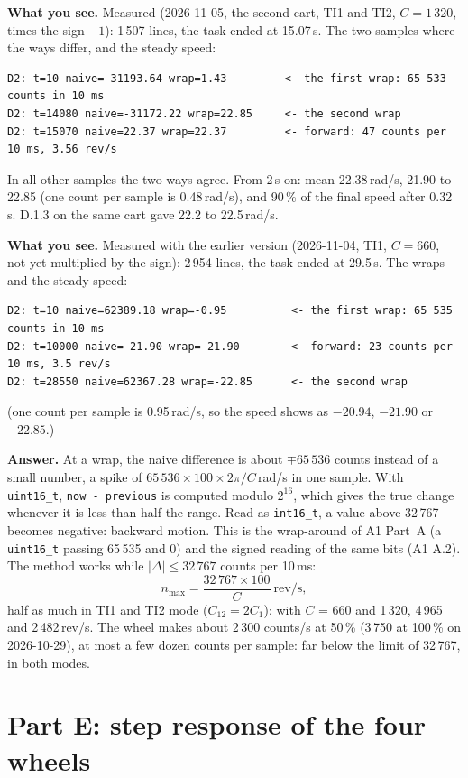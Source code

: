 \documentclass[11pt,a4paper]{article}
\newcommand{\see}[1]{\textbf{What you see.} #1}
\begin{document}
\see{Measured (2026-11-05, the second cart, TI1 and TI2, $C = 1\,320$, times the sign $-1$): 1\,507 lines, the task
ended at 15.07\,s. The two samples where the ways differ, and the steady speed:}
\begin{lstlisting}[language={},basicstyle=\ttfamily\scriptsize]
D2: t=10 naive=-31193.64 wrap=1.43         <- the first wrap: 65 533 counts in 10 ms
D2: t=14080 naive=-31172.22 wrap=22.85     <- the second wrap
D2: t=15070 naive=22.37 wrap=22.37         <- forward: 47 counts per 10 ms, 3.56 rev/s
\end{lstlisting}
In all other samples the two ways agree. From 2\,s on: mean 22.38\,rad/s, 21.90 to 22.85 (one count per sample
is 0.48\,rad/s), and 90\,\% of the final speed after 0.32\,s. D.1.3 on the same cart gave 22.2 to 22.5\,rad/s.

\see{Measured with the earlier version (2026-11-04, TI1, $C = 660$, not yet multiplied by the sign): 2\,954 lines,
the task ended at 29.5\,s. The wraps and the steady speed:}
\begin{lstlisting}[language={},basicstyle=\ttfamily\scriptsize]
D2: t=10 naive=62389.18 wrap=-0.95          <- the first wrap: 65 535 counts in 10 ms
D2: t=10000 naive=-21.90 wrap=-21.90        <- forward: 23 counts per 10 ms, 3.5 rev/s
D2: t=28550 naive=62367.28 wrap=-22.85      <- the second wrap
\end{lstlisting}
(one count per sample is 0.95\,rad/s, so the speed shows as $-20.94$, $-21.90$ or $-22.85$.)

\textbf{Answer.} At a wrap, the naive difference is about $\mp 65\,536$ counts instead of a small number, a spike of
$65\,536 \times 100 \times 2\pi / C$\,rad/s in one sample. With \texttt{uint16\_t}, \texttt{now - previous} is
computed modulo $2^{16}$, which gives the true change whenever it is less than half the range. Read as
\texttt{int16\_t}, a value above 32\,767 becomes negative: backward motion. This is the wrap-around of A1 Part~A (a
\texttt{uint16\_t} passing 65\,535 and 0) and the signed reading of the same bits (A1 A.2). The method works while
$|\Delta| \le 32\,767$ counts per 10\,ms:
\[
  n_\mathrm{max} = \frac{32\,767 \times 100}{C}\ \mathrm{rev/s},
\]
half as much in TI1 and TI2 mode ($C_{12} = 2C_1$): with $C$ = 660 and 1\,320, 4\,965 and 2\,482\,rev/s. The
wheel makes about 2\,300 counts/s at 50\,\% (3\,750 at 100\,\% on 2026-10-29), at most a few dozen counts per sample:
far below the limit of 32\,767, in both modes.

\section{Part E: step response of the four wheels}
\end{document}
